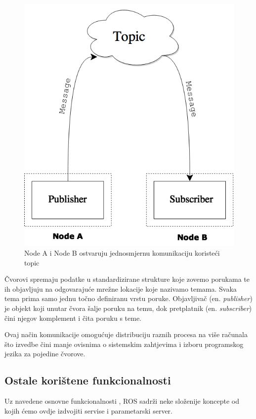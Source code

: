 \documentclass[times, utf8, diplomski, numeric]{fer}
\begin{document}
\begin{figure}[h!]
\begin{center}
\includegraphics[scale=0.41]{Zavrsni_ROS}
\caption{Node A i Node B ostvaruju jednosmjernu komunikaciju koristeći topic}
\end{center}
\end{figure}

Čvorovi spremaju podatke u standardizirane strukture koje zovemo porukama te ih objavljuju na odgovarajuće mrežne lokacije koje nazivamo temama. 
Svaka tema prima samo jednu točno definiranu vrstu poruke. 
Objavljivač (en. \textit{publisher}) je objekt koji unutar čvora šalje poruku na temu, dok pretplatnik (en. \textit{subscriber}) čini njegov komplement i čita poruku s teme.

Ovaj način komunikacije omogućuje distribuciju raznih procesa na više računala što izvedbe čini manje ovisnima o sistemskim zahtjevima i izboru programskog jezika za pojedine čvorove. 

\subsection{Ostale korištene funkcionalnosti}
Uz navedene osnovne funkcionalnosti , ROS sadrži neke složenije koncepte od kojih ćemo ovdje izdvojiti servise i parametarski server. 
\end{document}
